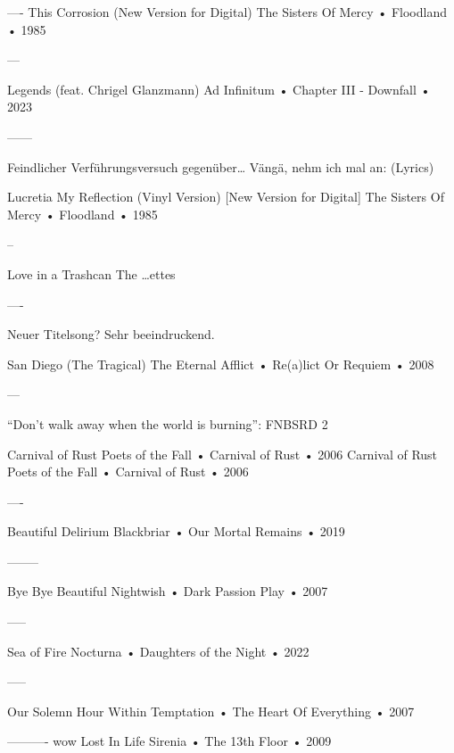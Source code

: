 —-
This Corrosion (New Version for Digital)
The Sisters Of Mercy
 •
Floodland
 •
1985


—


Legends (feat. Chrigel Glanzmann)
Ad Infinitum
 •
Chapter III - Downfall
 •
2023


—---


Feindlicher Verführungsversuch gegenüber… Vängä, nehm ich mal an:
(Lyrics)


Lucretia My Reflection (Vinyl Version) [New Version for Digital]
The Sisters Of Mercy
 •
Floodland
 •
1985


–


Love in a Trashcan
The …ettes


—-










Neuer Titelsong?
Sehr beeindruckend.

San Diego (The Tragical)
The Eternal Afflict
 •
Re(a)lict Or Requiem
 •
2008



—


“Don’t walk away when the world is burning”: FNBSRD 2


Carnival of Rust
Poets of the Fall
•
Carnival of Rust
• 2006
Carnival of Rust
Poets of the Fall
 •
Carnival of Rust
 •
2006


—-


Beautiful Delirium
Blackbriar
 •
Our Mortal Remains
 •
2019








—-----


Bye Bye Beautiful
Nightwish
 •
Dark Passion Play
 •
2007




—--




Sea of Fire
Nocturna
 •
Daughters of the Night
 •
2022




—--






Our Solemn Hour
Within Temptation
 •
The Heart Of Everything
 •
2007




—-------
wow
Lost In Life
Sirenia
•
The 13th Floor
• 2009






